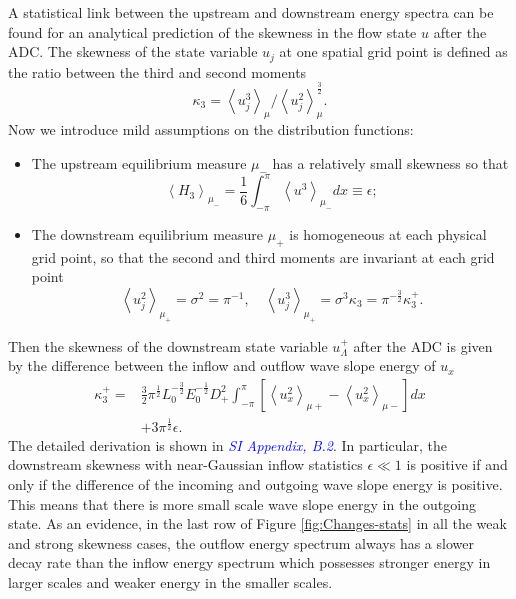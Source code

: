 \documentclass[9pt,twocolumn,twoside,lineno]{pnas-new}
\begin{document}
A statistical link between the upstream and downstream energy spectra
can be found for an analytical prediction of the skewness in the flow
state $u$ after the ADC. The skewness of the state variable $u_{j}$
at one spatial grid point is defined as the ratio between the third
and second moments
\[
\kappa_{3}=\left\langle u_{j}^{3}\right\rangle _{\mu}/\left\langle u_{j}^{2}\right\rangle _{\mu}^{\frac{3}{2}}.
\]
Now we introduce mild assumptions on the distribution functions:
\begin{itemize}
\item The upstream equilibrium measure $\mu_{-}$ has a relatively small
skewness so that
\[
\left\langle H_{3}\right\rangle _{\mu_{-}}=\frac{1}{6}\int_{-\pi}^{\pi}\left\langle u^{3}\right\rangle _{\mu_{-}}dx\equiv\epsilon;
\]
\item The downstream equilibrium measure $\mu_{+}$ is homogeneous at each
physical grid point, so that the second and third moments are invariant
at each grid point
\[
\left\langle u_{j}^{2}\right\rangle _{\mu_{+}}=\sigma^{2}=\pi^{-1},\quad\left\langle u_{j}^{3}\right\rangle _{\mu_{+}}=\sigma^{3}\kappa_{3}=\pi^{-\frac{3}{2}}\kappa_{3}^{+}.
\]
\end{itemize}
Then the skewness of the downstream state variable $u_{\Lambda}^{+}$
after the ADC is given by the difference between the inflow and outflow
wave slope energy of $u_x$
\begin{equation}
\begin{aligned}
\kappa_{3}^{+} = &\frac{3}{2}\pi^{\frac{1}{2}}L_{0}^{-\frac{3}{2}}E_{0}^{-\frac{1}{2}}D_{+}^{2}\int_{-\pi}^{\pi}\left[\left\langle u_{x}^{2}\right\rangle _{\mu+}-\left\langle u_{x}^{2}\right\rangle _{\mu-}\right]dx\\
 & +3\pi^{\frac{1}{2}}\epsilon.\label{eq:skewness}
\end{aligned}
\end{equation}
The detailed derivation is shown in \textcolor{blue}{\emph{SI Appendix, B.2}}.
In particular, the downstream skewness with near-Gaussian inflow statistics
$\epsilon\ll1$ is positive if and only if the difference of the incoming and outgoing 
wave slope energy is positive. This means that there is more
small scale wave slope energy in the outgoing state. As an evidence, 
in the last row of Figure \ref{fig:Changes-stats} in all the weak
and strong skewness cases, the outflow energy spectrum always has
a slower decay rate than the inflow energy spectrum which possesses
stronger energy in larger scales and weaker energy in the smaller
scales.
\end{document}
